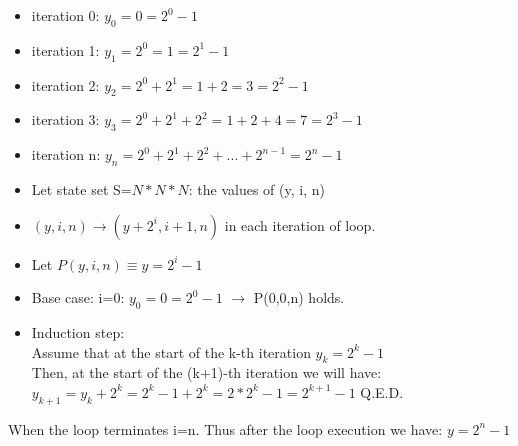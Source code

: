 \documentclass[solution, letterpaper]{cs20inclass}
\begin{document}
\begin{solution}
\subsolution
\begin{itemize}
\item iteration 0: $y_0=0=2^0-1$
\item iteration 1: $y_1=2^0=1=2^1-1$
\item iteration 2: $y_2=2^0+2^1=1+2=3=2^2-1$
\item iteration 3: $y_3=2^0+2^1+2^2=1+2+4=7=2^3-1$
\item iteration n: $y_n=2^0+2^1+2^2+...+2^{n-1}=2^n-1$
\end{itemize}
\subsolution
\begin{itemize}
\item Let state set S=$N*N*N$: the values of (y, i, n)
\item $(y,i,n) \rightarrow (y+2^i, i+1, n)$  in each iteration of loop.
\item Let $P(y, i, n)\equiv y=2^i -1$ 
\end{itemize}
\subsolution
\begin{itemize}
\item Base case: i=0: $y_0=0=2^0-1$ $\rightarrow$ P(0,0,n) holds.
\item Induction step: \\
Assume that at the start of the k-th iteration $y_k=2^k-1$\\
Then, at the start of the (k+1)-th iteration we will have:\\
$y_{k+1}=y_k+2^k=2^k-1+2^k=2*2^k-1=2^{k+1}-1$ Q.E.D.
\end{itemize}
\subsolution
When the loop terminates i=n. Thus after the loop execution we have: $y=2^{n}-1$
\end{solution}


\end{document}
